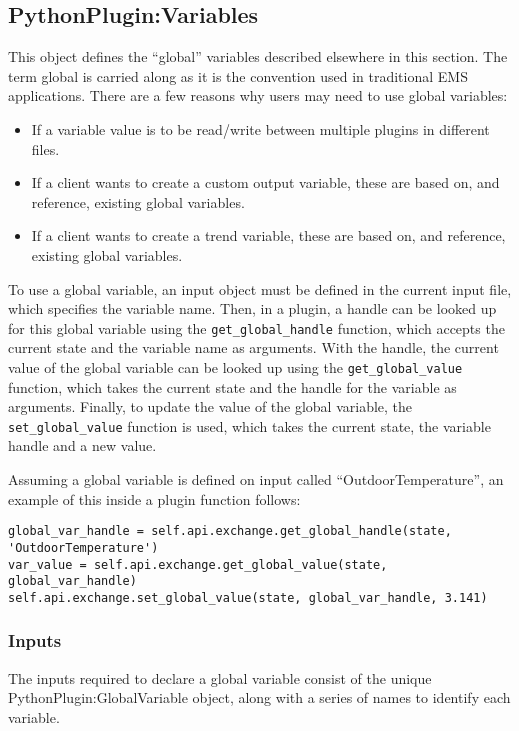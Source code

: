 \subsection{PythonPlugin:Variables}

This object defines the ``global'' variables described elsewhere in this section.
The term global is carried along as it is the convention used in traditional EMS applications.
There are a few reasons why users may need to use global variables:
\begin{itemize}
    \item If a variable value is to be read/write between multiple plugins in different files.
    \item If a client wants to create a custom output variable, these are based on, and reference, existing global variables.
    \item If a client wants to create a trend variable, these are based on, and reference, existing global variables.
\end{itemize}

To use a global variable, an input object must be defined in the current input file, which specifies the variable name.
Then, in a plugin, a handle can be looked up for this global variable using the \verb=get_global_handle= function, which accepts the current state and the variable name as arguments.
With the handle, the current value of the global variable can be looked up using the \verb=get_global_value= function, which takes the current state and the handle for the variable as arguments.
Finally, to update the value of the global variable, the \verb=set_global_value= function is used, which takes the current state, the variable handle and a new value.

Assuming a global variable is defined on input called ``OutdoorTemperature'', an example of this inside a plugin function follows:

\begin{lstlisting}
global_var_handle = self.api.exchange.get_global_handle(state, 'OutdoorTemperature')
var_value = self.api.exchange.get_global_value(state, global_var_handle)
self.api.exchange.set_global_value(state, global_var_handle, 3.141)
\end{lstlisting}

\subsubsection{Inputs}

The inputs required to declare a global variable consist of the unique PythonPlugin:GlobalVariable object, along with a series of names to identify each variable.

